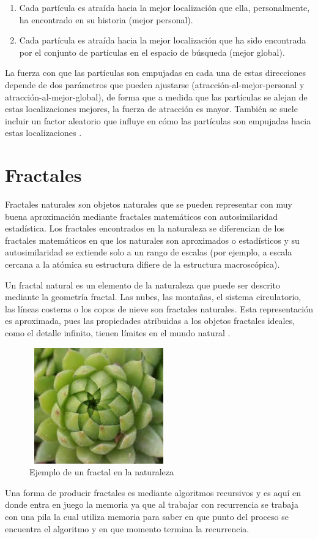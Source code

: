 \documentclass[12pt, titlepage]{article}
\begin{document}
\begin{enumerate}
    \item Cada partícula es atraída hacia la mejor localización que ella, personalmente, ha encontrado en su historia (mejor personal).
    \item Cada partícula es atraída hacia la mejor localización que ha sido encontrada por el conjunto de partículas en el espacio de búsqueda (mejor global).
\end{enumerate}

La fuerza con que las partículas son empujadas en cada una de estas direcciones depende de dos parámetros  que pueden ajustarse (atracción-al-mejor-personal y atracción-al-mejor-global), de forma que a medida que las partículas se alejan de estas localizaciones mejores, la fuerza de atracción es mayor. También se suele incluir un factor aleatorio que influye en cómo las partículas son empujadas hacia estas localizaciones \cite{PARTICULA}.
\section{Fractales}
Fractales naturales son objetos naturales que se pueden representar con muy buena aproximación mediante fractales matemáticos con autosimilaridad estadística. Los fractales encontrados en la naturaleza se diferencian de los fractales matemáticos en que los naturales son aproximados o estadísticos y su autosimilaridad se extiende solo a un rango de escalas (por ejemplo, a escala cercana a la atómica su estructura difiere de la estructura macroscópica).

Un fractal natural es un elemento de la naturaleza que puede ser descrito mediante la geometría fractal. Las nubes, las montañas, el sistema circulatorio, las líneas costeras o los copos de nieve son fractales naturales. Esta representación es aproximada, pues las propiedades atribuidas a los objetos fractales ideales, como el detalle infinito, tienen límites en el mundo natural \cite{FRACTAL}. 
\begin{figure}[H]
    \begin{center}
        \includegraphics[width=6cm, height=5cm]{./img/fractal.jpg}
        \caption{Ejemplo de un fractal en la naturaleza}
        \label{fig:fractales}
    \end{center}
\end{figure}
Una forma de producir fractales es mediante algoritmos recursivos y es aquí en donde entra en juego la memoria ya que al trabajar con recurrencia se trabaja con una pila la cual utiliza memoria para saber en que punto del proceso se encuentra el algoritmo y en que momento termina la recurrencia.
 

\end{document}
